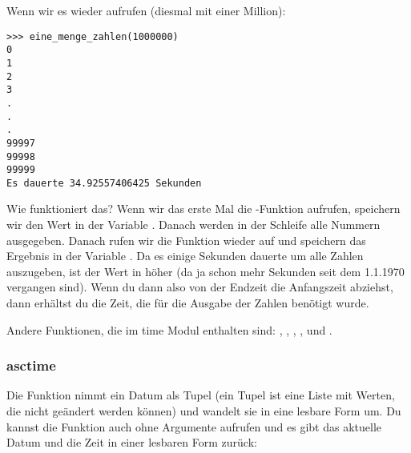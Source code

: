 \noindent
Wenn wir es wieder aufrufen (diesmal mit einer Million):

\begin{Verbatim}[frame=single]
>>> eine_menge_zahlen(1000000)
0
1
2
3
.
.
.
99997
99998
99999
Es dauerte 34.92557406425 Sekunden
\end{Verbatim}

\noindent
Wie funktioniert das? Wenn wir das erste Mal die -Funktion aufrufen, speichern wir den Wert in der Variable . Danach werden in der Schleife alle Nummern ausgegeben. Danach rufen wir die  Funktion wieder auf und speichern das Ergebnis in der Variable . Da es einige Sekunden dauerte um alle Zahlen auszugeben, ist der Wert in  höher (da ja schon mehr Sekunden seit dem 1.1.1970 vergangen sind). Wenn du dann also von der Endzeit  die Anfangszeit  abziehst, dann erhältst du die Zeit, die für die Ausgabe der Zahlen benötigt wurde.

Andere Funktionen, die im time Modul enthalten sind: , , , ,  und .

\subsubsection*{asctime}
Die Funktion  nimmt ein Datum als Tupel (ein Tupel ist eine Liste mit Werten, die nicht geändert werden können) und wandelt sie in eine lesbare Form um. Du kannst die Funktion auch ohne Argumente aufrufen und es gibt das aktuelle Datum und die Zeit in einer lesbaren Form zurück:

